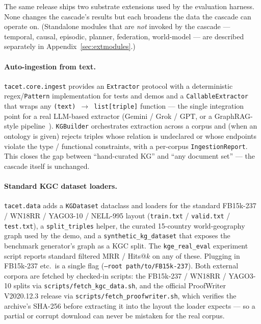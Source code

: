 \documentclass[11pt]{article}
\theoremstyle{plain}
\begin{document}
The same release ships two substrate extensions used by the evaluation
harness. None changes the cascade's results but each broadens the data the
cascade can operate on. (Standalone modules that are \emph{not} invoked by the
cascade --- temporal, causal, episodic, planner, federation, world-model ---
are described separately in Appendix~\ref{sec:extmodules}.)

\paragraph{Auto-ingestion from text.}
\texttt{tacet.core.ingest} provides an \texttt{Extractor} protocol with a
deterministic regex/\texttt{Pattern} implementation for tests and demos
and a \texttt{CallableExtractor} that wraps any
\texttt{(text) $\to$ list[triple]} function --- the single integration
point for a real LLM-based extractor (Gemini / Grok / GPT, or a
GraphRAG-style pipeline~\citep{edge2024graphrag}). \texttt{KGBuilder}
orchestrates extraction across a corpus and (when an ontology is given)
rejects triples whose relation is undeclared or whose endpoints violate
the type / functional constraints, with a per-corpus
\texttt{IngestionReport}. This closes the gap between ``hand-curated KG''
and ``any document set'' --- the cascade itself is unchanged.

\paragraph{Standard KGC dataset loaders.}
\texttt{tacet.data} adds a \texttt{KGDataset} dataclass and loaders
for the standard FB15k-237 / WN18RR / YAGO3-10 / NELL-995 layout
(\texttt{train.txt} / \texttt{valid.txt} / \texttt{test.txt}), a
\texttt{split\_triples} helper, the curated 15-country world-geography
graph used by the demo, and a \texttt{synthetic\_kg\_dataset} that exposes
the benchmark generator's graph as a KGC split. The
\texttt{kge\_real\_eval} experiment script reports standard filtered
MRR / Hits@$k$ on any of these. Plugging in FB15k-237 etc.\ is a single
flag (\texttt{--root path/to/FB15k-237}).
Both external corpora are fetched by checked-in scripts: the FB15k-237 /
WN18RR / YAGO3-10 splits via \texttt{scripts/fetch\_kgc\_data.sh}, and the
official ProofWriter V2020.12.3 release via
\texttt{scripts/fetch\_proofwriter.sh}, which verifies the archive's SHA-256
before extracting it into the layout the loader expects --- so a partial or
corrupt download can never be mistaken for the real corpus.
\end{document}
